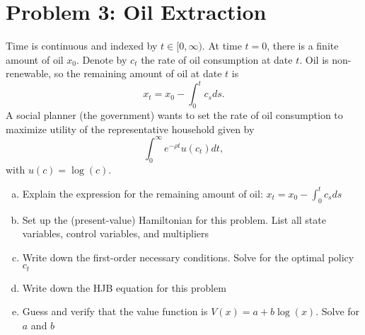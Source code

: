 \documentclass[11pt]{extarticle}
\theoremstyle{plain}
\theoremstyle{definition}
\begin{document}
\vspace{5mm}
\section*{Problem 3: Oil Extraction}

Time is continuous and indexed by $t \in [0, \infty)$. At time $t=0$, there is a finite amount of oil $x_0$. Denote by $c_t$ the rate of oil consumption at date $t$. Oil is non-renewable, so the remaining amount of oil at date $t$ is 
\begin{equation*}
	x_t = x_0 - \int_0^t c_s ds.
\end{equation*}
A social planner (the government) wants to set the rate of oil consumption to maximize utility of the representative household given by
\begin{equation*}
	\int_0^\infty e^{- \rho t} u(c_t) dt,
\end{equation*}
with $u(c) = \log(c)$. 

\vspace{2mm}
\begin{enumerate}[(a)]
\item Explain the expression for the remaining amount of oil: $x_t = x_0 - \int_0^t c_s ds$

\item Set up the (present-value) Hamiltonian for this problem. List all state variables, control variables, and multipliers

\item Write down the first-order necessary conditions. Solve for the optimal policy $c_t$

\item Write down the HJB equation for this problem

\item Guess and verify that the value function is $V(x) = a + b \log(x)$. Solve for $a$ and $b$
\end{enumerate}
\end{document}
